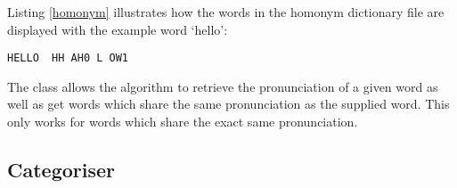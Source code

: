 Listing \ref{homonym} illustrates how the words in the homonym dictionary file are
displayed with the example word `hello':

\begin{lstlisting}[caption={A sample of the homonym dictionary file for the word `hello'},
                   label=homonym]  
HELLO  HH AH0 L OW1
\end{lstlisting}

The class allows the algorithm to retrieve the pronunciation of a given word as well as 
get words which share the same pronunciation as the supplied word. This only works for words
 which share the exact same pronunciation.

\subsection{Categoriser}